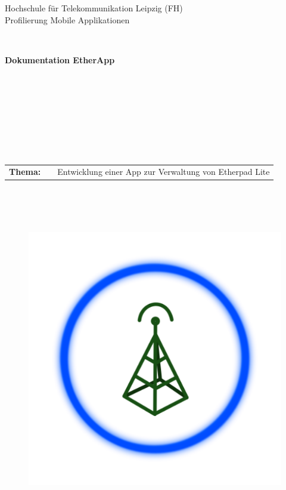 \thispagestyle{empty}
\begin{center}
\Large{Hochschule für Telekommunikation Leipzig (FH)}\\

\Large{Profilierung Mobile Applikationen}\\
\end{center}
\begin{verbatim}


\end{verbatim}
\begin{center}
\textbf{\Huge{Dokumentation EtherApp}}
\end{center}
\begin{verbatim}








\end{verbatim}
\begin{flushleft}
\begin{tabular}{llp{12cm}}
\textbf{Thema:} & & \LARGE{Entwicklung einer App zur Verwaltung von Etherpad Lite}\\
\end{tabular}
\end{flushleft}
\begin{verbatim}




\end{verbatim}

\begin{figure}[h!]
    \centering
	\includegraphics[scale=0.40]{./inc/launcher.png}
\end{figure}

